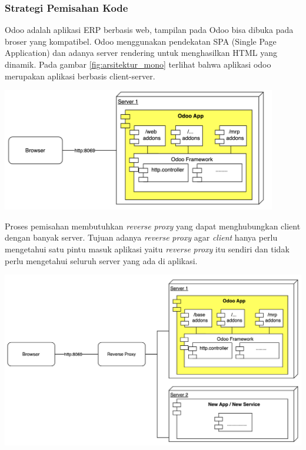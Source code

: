 \subsubsection{Strategi Pemisahan Kode}
Odoo adalah aplikasi ERP berbasis web, tampilan pada Odoo bisa dibuka pada broser yang kompatibel. Odoo menggunakan pendekatan SPA (Single Page Application) dan adanya server rendering untuk menghasilkan HTML yang dinamik. Pada gambar \ref{fig:arsitektur_mono} terlihat bahwa aplikasi odoo merupakan aplikasi berbasis client-server.
\begin{center}
	\includegraphics[width=12cm]{img/bab_3/mono_ori.png}
	\label{fig:arsitektur_mono}
\end{center}

Proses pemisahan membutuhkan \textit{reverse} \textit{proxy} yang dapat menghubungkan client dengan banyak server. Tujuan adanya \textit{reverse} \textit{proxy} agar \textit{client} hanya perlu mengetahui satu pintu masuk aplikasi yaitu \textit{reverse} \textit{proxy} itu sendiri dan tidak perlu mengetahui seluruh server yang ada di aplikasi.

\begin{center}
	\includegraphics[width=14cm]{img/bab_3/micro_proxy.png}
	\label{fig:arsitektu_micro}
\end{center}


